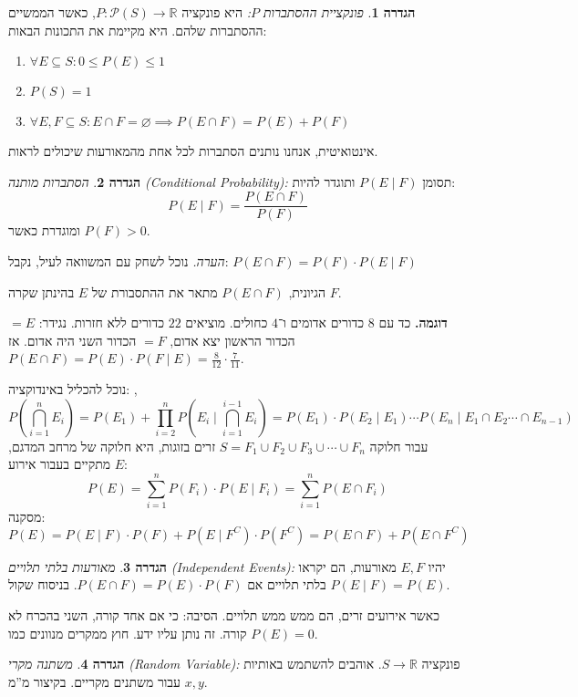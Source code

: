 \documentclass[]{article}
\newcommand\R     {\mathbb{R}}
\newcommand\ps    {\mathcal{P}}
\newcommand\co        {\colon}
\newcommand\cl [1]    {\left ( #1 \right )}
\theoremstyle{definition}
\newtheorem{definition}{הגדרה}
\newcommand\defi  [1] {\begin{definition}#1\end{definition}}
\begin{document}
    \defi{\textit{פונקציית ההסתברות $P$: }היא פונקציה $P \co \ps(S) \to \R$, כאשר הממשיים ההסתברות שלהם. היא מקיימת את התכונות הבאות: \\
    \begin{enumerate}
        \item \hfil $\forall E \subseteq S \co 0 \le P(E) \le 1$
        \item \hfil $P(S) = 1$
        \item \hfil $\forall E, F \subseteq S \co E \cap F = \varnothing \implies P(E \cap F) = P(E) + P(F)$
    \end{enumerate}}
        אינטואיטית, אנחנו נותנים הסתברות לכל אחת מהמאורעות שיכולים לראות. 
    \defi{\textit{הסתברות מותנה (Conditional Probability): }תסומן $P(E \mid F)$ ותוגדר להיות: 
    \[ P(E \mid F) = \frac{P(E \cap F)}{P(F)} \]
    ומוגדרת כאשר $P(F) > 0$. }
    \textit{הערה. }נוכל לשחק עם המשוואה לעיל, נקבל: $P(E \cap F) = P(F) \cdot P(E \mid F)$
    
    הגיונית, $P(E \cap F)$ מתאר את ההתסבורת של $E$ בהינתן שקרה $F$. 
        
    \textbf{דוגמה. }כד עם 8 כדורים אדומים ו־$4$ כחולים. מוציאים $22$ כדורים ללא חזרות. נגידר: $=E$הכדור הראשון יצא אדום, $=F$ הכדור השני היה אדום. אז $P(E \cap F) = P(E) \cdot P(F \mid E) = \frac{8}{12} \cdot \frac{7}{11}$. 
        
        נוכל להכליל באינדוקציה: ,
    \[ P\cl{\bigcap_{i = 1}^{n}E_i} = P(E_1) + \prod_{i = 2}^{n}P\cl{E_i \mid \bigcap^{i - 1}_{i = 1}E_i} = P(E_1) \cdot P(E_2 \mid E_1) \cdots P(E_n \mid E_1 \cap E_2 \cdots \cap E_{n - 1}) \]
        עבור חלוקה $S = F_1 \cup F_2 \cup F_3 \cup \cdots \cup F_n$ זרים בזוגות, היא חלוקה של מרחב המדגם, מתקיים בעבור אירוע $E$: 
    \[ P(E) = \sum_{i = 1}^{n}P(F_i) \cdot P(E \mid F_i) = \sum_{i = 1}^{n}P(E \cap F_i) \]
        מסקנה: 
    \[ P(E) = P(E \mid F) \cdot P(F) + P(E \mid F^{C}) \cdot P(F^{C}) = P(E \cap F) + P(E \cap F^{C}) \]
        
    \defi{\textit{מאורעות בלתי תלויים (Independent Events): }יהיו $E, F$ מאורעות, הם יקראו בלתי תלויים אם $P(E \cap F) = P(E) \cdot P(F)$. בניסוח שקול $P(E \mid F) = P(E)$. }
    
    כאשר אירועים זרים, הם ממש ממש תלויים. הסיבה: כי אם אחד קורה, השני בהכרח לא קורה. זה נותן עליו ידע. חוץ ממקרים מנוונים כמו $P(E) = 0$. 
    
    \defi{\textit{משתנה מקרי (Random Variable): }פונקציה $S \to \R$. אוהבים להשתמש באותיות $x, y$ עבור משתנים מקריים. בקיצור מ''מ. }
    
\end{document}
